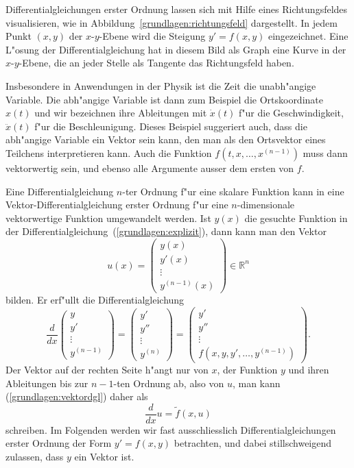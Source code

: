 Differentialgleichungen erster Ordnung lassen sich mit Hilfe eines
Richtungsfeldes visualisieren, wie in Abbildung~\ref{grundlagen:richtungsfeld}
dargestellt.
In jedem Punkt $(x,y)$ der $x$-$y$-Ebene wird die Steigung $y'=f(x,y)$
eingezeichnet.
Eine L"osung der Differentialgleichung hat in diesem Bild als Graph
eine Kurve in der $x$-$y$-Ebene, die an jeder Stelle als Tangente 
das Richtungsfeld haben.

Insbesondere in Anwendungen in der Physik ist die Zeit die
unabh"angige Variable.
Die abh"angige Variable ist dann zum Beispiel die Ortskoordinate
$x(t)$ und wir bezeichnen ihre Ableitungen mit $\dot{x}(t)$ f"ur
die Geschwindigkeit, $\ddot{x}(t)$ f"ur die Beschleunigung.
Dieses Beispiel suggeriert auch, dass die abh"angige Variable 
ein Vektor sein kann, den man als den Ortsvektor eines Teilchens
interpretieren kann.
Auch die Funktion $f(t,x,\dots,x^{(n-1)})$ muss dann vektorwertig sein, und
ebenso alle Argumente ausser dem ersten von $f$.

Eine Differentialgleichung $n$-ter Ordnung f"ur eine skalare Funktion
kann in eine Vektor-Differen\-tialgleichung erster Ordnung f"ur eine
$n$-dimensionale vektorwertige Funktion umgewandelt werden.
Ist $y(x)$ die gesuchte Funktion in der
Differentialgleichung~(\ref{grundlagen:explizit}), dann kann man
den Vektor
\[
u(x)=\begin{pmatrix}
y(x)\\y'(x)\\\vdots\\y^{(n-1)}(x)
\end{pmatrix}
\in\mathbb R^n
\]
bilden.
Er erf"ullt die Differentialgleichung
\begin{equation}
\frac{d}{dx}\begin{pmatrix}
y\\y'\\\vdots\\y^{(n-1)}
\end{pmatrix}
=
\begin{pmatrix}
y'\\y''\\\vdots\\y^{(n)}
\end{pmatrix}
=
\begin{pmatrix}
y'\\y''\\\vdots\\f(x,y,y',\dots,y^{(n-1)})
\end{pmatrix}.
\label{grundlagen:vektordgl}
\end{equation}
Der Vektor auf der rechten Seite h"angt nur von $x$, der Funktion $y$
und ihren Ableitungen bis zur $n-1$-ten Ordnung ab, also von $u$, man
kann (\ref{grundlagen:vektordgl}) daher als
\begin{equation}
\frac{d}{dx}u=\tilde{f}(x,u)
\end{equation}
schreiben.
Im Folgenden werden wir fast ausschliesslich Differentialgleichungen
erster Ordnung der Form $y'=f(x,y)$ betrachten, und dabei stillschweigend
zulassen, dass $y$ ein Vektor ist.

